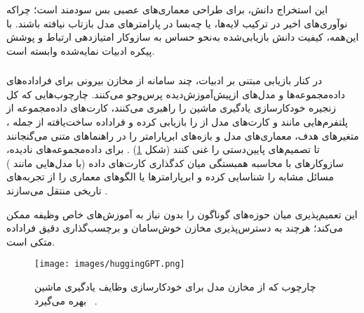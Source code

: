 این استخراج دانش، برای طراحی معماری‌های عصبی بس سودمند است؛ چراکه نوآوری‌های اخیر در ترکیب لایه‌ها،  یا  چه‌بسا در پارامترهای  مدل بازتاب نیافته باشند. با این‌همه، کیفیت دانش بازیابی‌شده به‌نحو حساس به سازوکار امتیازدهی ارتباط و پوشش پیکره ادبیات نمایه‌شده وابسته است.

\subsubsection{\protect{}}

در کنار بازیابی مبتنی بر ادبیات، چند سامانه از مخازن بیرونی برای فراداده‌های داده‌مجموعه‌ها و مدل‌های ازپیش‌آموزش‌دیده پرس‌وجو می‌کنند. چارچوب‌هایی که کل زنجیره خودکارسازی یادگیری ماشین را راهبری می‌کنند، کارت‌های داده‌مجموعه از پلتفرم‌هایی مانند  و کارت‌های مدل از  را بازیابی کرده و فراداده ساخت‌یافته از جمله ، متغیرهای هدف، معماری‌های مدل و بازه‌های ابرپارامتر را در راهنماهای متنی می‌گنجانند تا تصمیم‌های پایین‌دستی را غنی کنند (شکل \ref{fig:huggingGPT}) \cite{trirat2025automlagent, shen2023HuggingGPT}. برای داده‌مجموعه‌های نادیده، سازوکارهای  با محاسبه همبستگی میان کدگذاری کارت‌های داده (با مدل‌هایی مانند ) مسائل مشابه را شناسایی کرده و ابرپارامترها یا الگوهای معماری را از تجربه‌های تاریخی منتقل می‌سازند \cite{zhang2023AutomlGPTAutomaticMachineLearning}.

این  تعمیم‌پذیری میان حوزه‌های گوناگون را بدون نیاز به آموزش‌های خاص وظیفه ممکن می‌کند؛ هرچند به دسترس‌پذیری مخازن خوش‌سامان و برچسب‌گذاری دقیق فراداده متکی است.
\begin{figure}[h!]
    \centering
    \texttt{[image: images/huggingGPT.png]}
    \caption[ چارچوب HuggingGPT برای خودکارسازی یادگیری ماشین]{
        چارچوب  که از مخازن مدل  برای خودکارسازی وظایف یادگیری ماشین بهره می‌گیرد~
        \cite{shen2023HuggingGPT}.
    }
    \label{fig:huggingGPT}

\end{figure}
\subsection[راهبردهای تقویت آمیخته]{}

